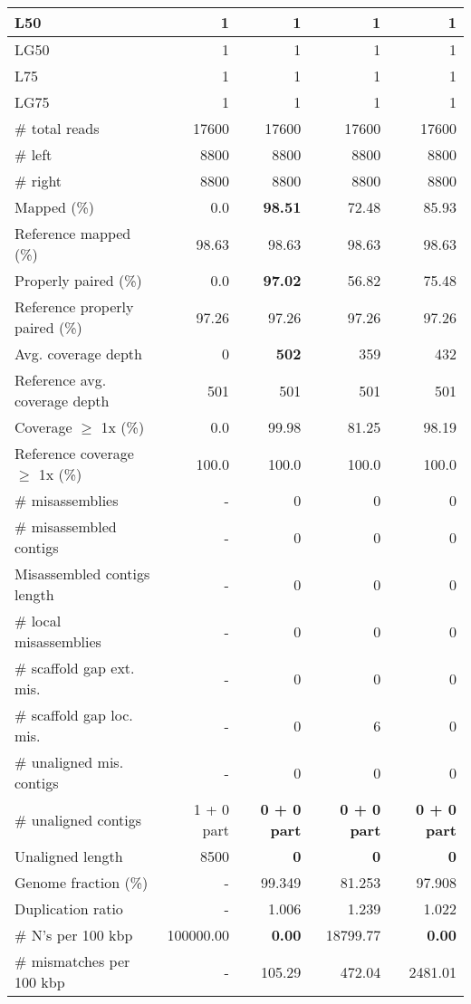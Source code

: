 \documentclass[12pt,a4paper]{article}
\begin{document}
\begin{table}[ht]
\begin{center}
\begin{tabular}{|l*{4}{|r}|}
L50 & 1 & 1 & 1 & 1 \\ \hline
LG50 & 1 & 1 & 1 & 1 \\ \hline
L75 & 1 & 1 & 1 & 1 \\ \hline
LG75 & 1 & 1 & 1 & 1 \\ \hline
\# total reads & 17600 & 17600 & 17600 & 17600 \\ \hline
\# left & 8800 & 8800 & 8800 & 8800 \\ \hline
\# right & 8800 & 8800 & 8800 & 8800 \\ \hline
Mapped (\%) & 0.0 & {\bf 98.51} & 72.48 & 85.93 \\ \hline
Reference mapped (\%) & 98.63 & 98.63 & 98.63 & 98.63 \\ \hline
Properly paired (\%) & 0.0 & {\bf 97.02} & 56.82 & 75.48 \\ \hline
Reference properly paired (\%) & 97.26 & 97.26 & 97.26 & 97.26 \\ \hline
Avg. coverage depth & 0 & {\bf 502} & 359 & 432 \\ \hline
Reference avg. coverage depth & 501 & 501 & 501 & 501 \\ \hline
Coverage $\geq$ 1x (\%) & 0.0 & 99.98 & 81.25 & 98.19 \\ \hline
Reference coverage $\geq$ 1x (\%) & 100.0 & 100.0 & 100.0 & 100.0 \\ \hline
\# misassemblies & - & 0 & 0 & 0 \\ \hline
\# misassembled contigs & - & 0 & 0 & 0 \\ \hline
Misassembled contigs length & - & 0 & 0 & 0 \\ \hline
\# local misassemblies & - & 0 & 0 & 0 \\ \hline
\# scaffold gap ext. mis. & - & 0 & 0 & 0 \\ \hline
\# scaffold gap loc. mis. & - & 0 & 6 & 0 \\ \hline
\# unaligned mis. contigs & - & 0 & 0 & 0 \\ \hline
\# unaligned contigs & 1 + 0 part & {\bf 0 + 0 part} & {\bf 0 + 0 part} & {\bf 0 + 0 part} \\ \hline
Unaligned length & 8500 & {\bf 0} & {\bf 0} & {\bf 0} \\ \hline
Genome fraction (\%) & - & 99.349 & 81.253 & 97.908 \\ \hline
Duplication ratio & - & 1.006 & 1.239 & 1.022 \\ \hline
\# N's per 100 kbp & 100000.00 & {\bf 0.00} & 18799.77 & {\bf 0.00} \\ \hline
\# mismatches per 100 kbp & - & 105.29 & 472.04 & 2481.01 \\ \hline

\end{tabular}
\end{center}
\end{table}
\end{document}
